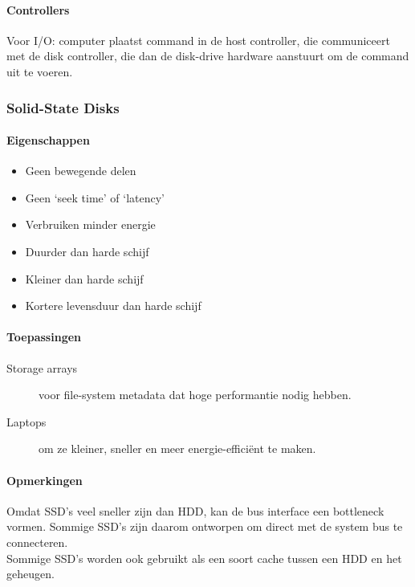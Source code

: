 \paragraph{Controllers}
Voor I/O: computer plaatst command in de host controller, die communiceert met de disk controller, die dan de disk-drive hardware aanstuurt om de command uit te voeren.
\subsubsection{Solid-State Disks}
\paragraph{Eigenschappen}
\begin{itemize}
	\item Geen bewegende delen
	\item Geen `seek time' of `latency'
	\item Verbruiken minder energie
	\item Duurder dan harde schijf
	\item Kleiner dan harde schijf
	\item Kortere levensduur dan harde schijf
\end{itemize}

\paragraph{Toepassingen}
\begin{description}
	\item[Storage arrays] voor file-system metadata dat hoge performantie nodig hebben.
	\item[Laptops] om ze kleiner, sneller en meer energie-effici\"{e}nt te maken.
\end{description}

\paragraph{Opmerkingen}
Omdat SSD's veel sneller zijn dan HDD, kan de bus interface een bottleneck vormen. Sommige SSD's zijn daarom ontworpen om direct met de system bus te connecteren. \\
Sommige SSD's worden ook gebruikt als een soort cache tussen een HDD en het geheugen.
